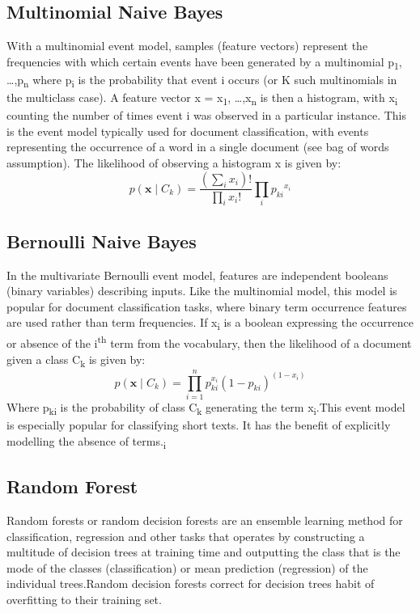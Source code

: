 \documentclass[12pt,a4paper]{report}
\begin{document}
\subsection{Multinomial Naive Bayes}
With a multinomial event model, samples (feature vectors) represent the frequencies with which certain events have been generated by a multinomial p\textsubscript{1}, \dots ,p\textsubscript{n} where p\textsubscript{i} is the probability that event i occurs (or K such multinomials in the multiclass case).  A feature vector x = x\textsubscript{1}, \dots ,x\textsubscript{n} is then a histogram, with x\textsubscript{i} counting the number of times event i was observed in a particular instance.  This is the event model typically used for document classification, with events representing the occurrence of a word in a single document (see bag of words assumption). The likelihood of observing a histogram x is given by:
\begin{equation}
p(\mathbf{x} \mid C_k) = \frac{(\sum_i x_i)!}{\prod_i x_i !} \prod_i {p_{ki}}^{x_i}
\end{equation}

\subsection{Bernoulli Naive Bayes}
\justifying
In the multivariate Bernoulli event model, features are independent booleans (binary variables) describing inputs. Like the multinomial model, this model is popular for document classification tasks, where binary term occurrence features are used rather than term frequencies. If x\textsubscript{i} is a boolean expressing the occurrence or absence of the i\textsuperscript{th} term from the vocabulary, then the likelihood of a document given a class C\textsubscript{k} is given by:
\begin{equation}
p(\mathbf{x} \mid C_k) = \prod_{i=1}^n p_{ki}^{x_i} (1 - p_{ki})^{(1-x_i)}
\end{equation}
Where p\textsubscript{ki} is the probability of class C\textsubscript{k} generating the term x\textsubscript{i}.This event model is especially popular for classifying short texts. It has the benefit of explicitly modelling the absence of terms.\textsubscript{i}

\subsection{Random Forest}
\justifying
Random forests or random decision forests are an ensemble learning method for classification, regression and other tasks that operates by constructing a multitude of decision trees at training time and outputting the class that is the mode of the classes (classification) or mean prediction (regression) of the individual trees.Random decision forests correct for decision trees habit of overfitting to their training set.\cite{ref3}
\end{document}
